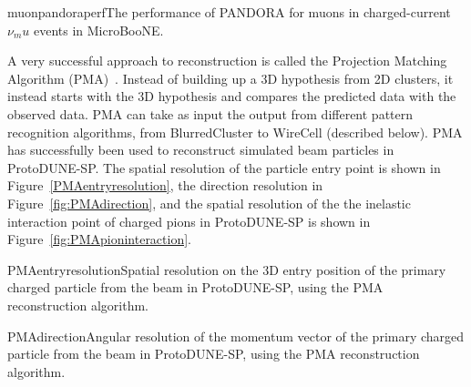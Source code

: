 \begin{cdrfigure}{muonpandoraperf}{The performance of PANDORA for muons in charged-current
  $\nu_mu$ events in MicroBooNE. }
\end{cdrfigure}


A very successful approach to reconstruction is called the Projection
Matching Algorithm (PMA)~\cite{pma_algorithm}.  Instead of building up
a 3D hypothesis from 2D clusters, it instead starts with the 3D
hypothesis and compares the predicted data with the observed data.
PMA can take as input the output from different pattern recognition
algorithms, from BlurredCluster to WireCell (described below).  PMA
has successfully been used to reconstruct simulated beam particles in
ProtoDUNE-SP.  The spatial resolution of the particle entry point is
shown in Figure~\ref{PMAentryresolution}, the direction resolution in
Figure~\ref{fig:PMAdirection}, and the spatial resolution of the the
inelastic interaction point of charged pions in ProtoDUNE-SP is shown
in Figure~\ref{fig:PMApioninteraction}.

\begin{cdrfigure}{PMAentryresolution}{Spatial resolution on the 3D entry position of the primary
  charged particle from the beam in ProtoDUNE-SP, using the PMA
  reconstruction algorithm.}
\end{cdrfigure}

\begin{cdrfigure}{PMAdirection}{Angular resolution of the momentum vector of the primary
  charged particle from the beam in ProtoDUNE-SP, using the PMA
  reconstruction algorithm.}
\end{cdrfigure}




